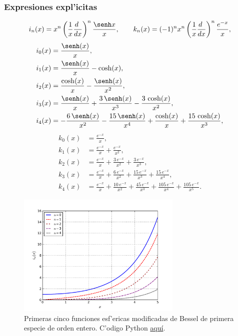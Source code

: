\subsubsection{Expresiones expl'icitas}
\begin{equation}
i_n(x)=x^n\left(\frac{1}{x}\frac{d\ }{dx}\right)^n\frac{\senh x}{x}, \qquad 
k_n(x)=(-1)^nx^n\left(\frac{1}{x}\frac{d\ }{dx}\right)^n\frac{e^{-x}}{x},
\end{equation}
\begin{align}
i_0(x) &= \frac{\senh (x)}{x}, \\
i_1(x) &= \frac{\senh (x)}{x}-\cosh (x), \\
i_2(x) &=\frac{\cosh (x)}{x}-\frac{\senh (x) }{{x}^{2}}, \\
i_3(x) &= \frac{\senh (x)}{x}+\frac{3\,\senh (x) }{{x}^{3}}-\frac{3\,\cosh (x) }{{x}^{2}}, \\
i_4(x) &= -\frac{6\,\senh (x) }{{x}^{2}}-\frac{15\,\senh (x) }{{x}^{4}}+\frac{\cosh (x) }{x}+\frac{15\,\cosh (x) }{{x}^{3}},
\end{align}
\begin{align}
k_0(x) &= \frac{{e}^{-x}}{x} , \\
k_1(x) &= \frac{{e}^{-x}}{x}+\frac{{e}^{-x}}{{x}^{2}}, \\
k_2(x) &= \frac{{e}^{-x}}{x}+\frac{3\,{e}^{-x}}{{x}^{2}}+\frac{3\,{e}^{-x}}{{x}^{3}}, \\
k_3(x) &= \frac{{e}^{-x}}{x}+\frac{6\,{e}^{-x}}{{x}^{2}}+\frac{15\,{e}^{-x}}{{x}^{3}}+\frac{15\,{e}^{-x}}{{x}^{4}}, \\
k_4(x) &= \frac{{e}^{-x}}{x}+\frac{10\,{e}^{-x}}{{x}^{2}}+\frac{45\,{e}^{-x}}{{x}^{3}}+\frac{105\,{e}^{-x}}{{x}^{4}}+\frac{105\,{e}^{-x}}{{x}^{5}}.
\end{align}
\begin{figure}[H]
\centering
\includegraphics[angle=0,width=0.7\textwidth]{figs/fig-Bessel-Esferica-i.pdf}
\caption{Primeras cinco funciones esf'ericas modificadas de Bessel de primera especie de orden entero. C'odigo Python \href{https://github.com/gfrubi/FM2/blob/master/figuras-editables/fig-Bessel.py}{aqu\'i}.}
\label{fig-in}
\end{figure}
